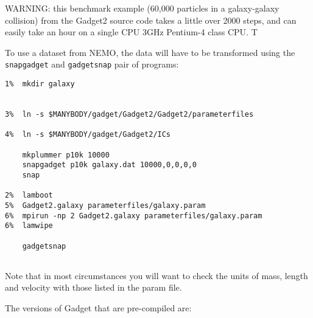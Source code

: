 WARNING: this benchmark example (60,000 particles in a galaxy-galaxy collision)
 from the Gadget2  source code takes a little
over 2000 steps,
and can easily take an hour on a single CPU 3GHz Pentium-4 class CPU. T

To use a dataset from NEMO, the data will have to be transformed using the
{\tt snapgadget} and {\tt gadgetsnap} pair of programs:

\footnotesize\begin{verbatim}
1%  mkdir galaxy


3%  ln -s $MANYBODY/gadget/Gadget2/Gadget2/parameterfiles

4%  ln -s $MANYBODY/gadget/Gadget2/ICs

    mkplummer p10k 10000
    snapgadget p10k galaxy.dat 10000,0,0,0,0
    snap

2%  lamboot
5%  Gadget2.galaxy parameterfiles/galaxy.param
6%  mpirun -np 2 Gadget2.galaxy parameterfiles/galaxy.param
6%  lamwipe

    gadgetsnap 


\end{verbatim}\normalsize

Note that in most circumstances you will want to check the units of mass, length and velocity
with those listed in the param file.

The versions of Gadget that are pre-compiled are:

